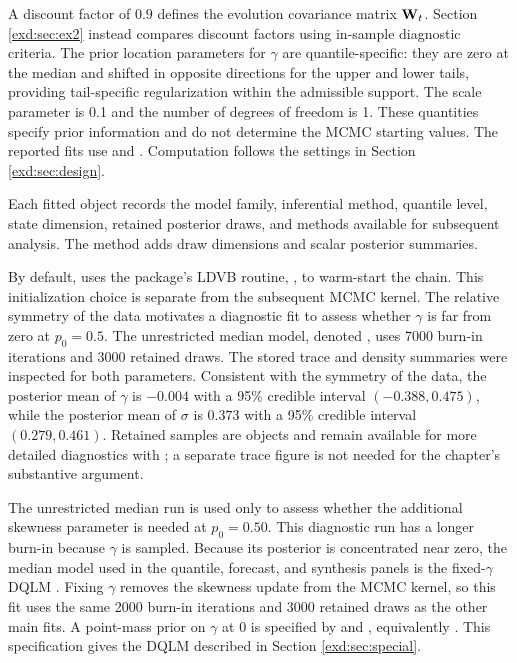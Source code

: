 A discount factor of $0.9$ defines the evolution covariance matrix
$\mathbf{W}_t$. Section \ref{exd:sec:ex2} instead compares discount factors using
in-sample diagnostic criteria. The prior location parameters for \(\gamma\) are
quantile-specific: they are zero at the median and shifted in opposite
directions for the upper and lower tails, providing tail-specific
regularization within the admissible support. The scale parameter is 0.1 and
the number of degrees of freedom is 1. These quantities specify prior
information and do not determine the MCMC starting values. The reported fits
use  and . Computation follows the
settings in Section \ref{exd:sec:design}.



Each fitted object records the model family, inferential method, quantile level,
state dimension, retained posterior draws, and methods available for subsequent
analysis. The  method adds draw dimensions and scalar posterior
summaries.


By default,  uses the package's LDVB routine,
, to warm-start the chain. This initialization choice is
separate from the subsequent MCMC kernel. The relative symmetry of the data
motivates a diagnostic fit to assess whether \(\gamma\) is far from zero at
\(p_0 = 0.5\). The unrestricted median model, denoted , uses
7000 burn-in iterations and 3000 retained
draws. The stored trace and density summaries were inspected for both
parameters. Consistent with the symmetry of the data, the posterior mean of
\(\gamma\) is \(-0.004\) with a 95\% credible interval
\((-0.388, 0.475)\), while the posterior mean of \(\sigma\) is \(0.373\) with
a 95\% credible interval \((0.279, 0.461)\). Retained samples are 
objects and remain available for more detailed diagnostics with 
\citep{exd-coda}; a separate trace figure is not needed for the chapter's
substantive argument.



The unrestricted median run is used only to assess whether the additional
skewness parameter is needed at \(p_0=0.50\). This diagnostic run has a longer
burn-in because \(\gamma\) is sampled. Because its posterior is concentrated
near zero, the median model used in the quantile, forecast, and synthesis
panels is the fixed-\(\gamma\) DQLM . Fixing \(\gamma\) removes
the skewness update from the MCMC kernel, so this fit uses the same 2000
burn-in iterations and 3000 retained draws as the other main fits. A
point-mass prior on $\gamma$ at 0 is specified by  and
, equivalently . This
specification gives the DQLM described in Section \ref{exd:sec:special}.



